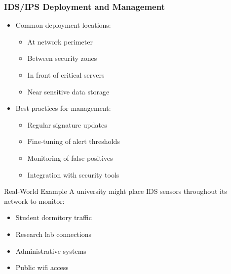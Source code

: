 \documentclass{beamer}
\begin{document}
\begin{frame}
    \frametitle{IDS/IPS Deployment and Management}
    
    \begin{itemize}
        \item Common deployment locations:
        \begin{itemize}
            \item At network perimeter
            \item Between security zones
            \item In front of critical servers
            \item Near sensitive data storage
        \end{itemize}
        
        \item Best practices for management:
        \begin{itemize}
            \item Regular signature updates
            \item Fine-tuning of alert thresholds
            \item Monitoring of false positives
            \item Integration with security tools
        \end{itemize}
    \end{itemize}
    
    \begin{block}{Real-World Example}
        A university might place IDS sensors throughout its network to monitor:
        \begin{itemize}
            \item Student dormitory traffic
            \item Research lab connections
            \item Administrative systems
            \item Public wifi access
        \end{itemize}
    \end{block}
\end{frame}
\end{document}
